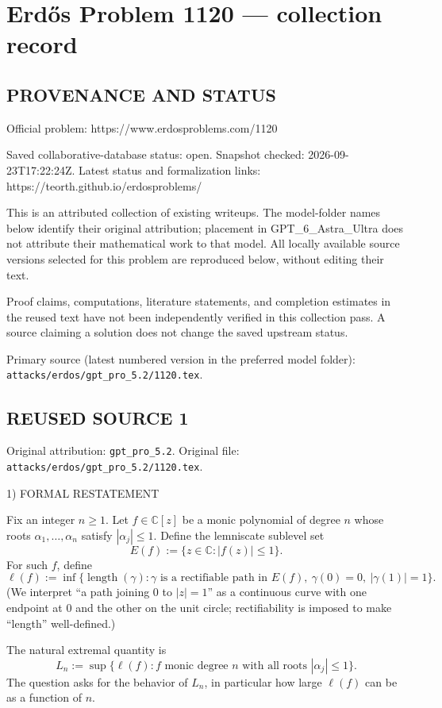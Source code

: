 \section*{Erd\H{o}s Problem 1120 --- collection record}

\subsection*{PROVENANCE AND STATUS}
Official problem: https://www.erdosproblems.com/1120

Saved collaborative-database status: open.
Snapshot checked: 2026-09-23T17:22:24Z.
Latest status and formalization links: https://teorth.github.io/erdosproblems/

This is an attributed collection of existing writeups. The model-folder names below identify their original attribution; placement in GPT\_6\_Astra\_Ultra does not attribute their mathematical work to that model. All locally available source versions selected for this problem are reproduced below, without editing their text.

Proof claims, computations, literature statements, and completion estimates in the reused text have not been independently verified in this collection pass. A source claiming a solution does not change the saved upstream status.

Primary source (latest numbered version in the preferred model folder): \texttt{attacks/erdos/gpt\_pro\_5.2/1120.tex}.

\subsection*{REUSED SOURCE 1}
Original attribution: \texttt{gpt\_pro\_5.2}.
Original file: \texttt{attacks/erdos/gpt\_pro\_5.2/1120.tex}.


1) FORMAL RESTATEMENT

Fix an integer \(n\ge 1\). Let \(f\in\mathbb{C}[z]\) be a monic polynomial of degree \(n\) whose roots \(\alpha_1,\dots,\alpha_n\) satisfy \(|\alpha_j|\le 1\).
Define the lemniscate sublevel set
\[
E(f):=\{z\in\mathbb{C}: |f(z)|\le 1\}.
\]
For such \(f\), define
\[
\ell(f):=\inf\{\operatorname{length}(\gamma): \gamma\text{ is a rectifiable path in }E(f),\ \gamma(0)=0,\ |\gamma(1)|=1\}.
\]
(We interpret ``a path joining \(0\) to \(|z|=1\)'' as a continuous curve with one endpoint at \(0\) and the other on the unit circle; rectifiability is imposed to make ``length'' well-defined.)

The natural extremal quantity is
\[
L_n:=\sup\{\ell(f): f\text{ monic degree }n\text{ with all roots }|\alpha_j|\le 1\}.
\]
The question asks for the behavior of \(L_n\), in particular how large \(\ell(f)\) can be as a function of \(n\).


